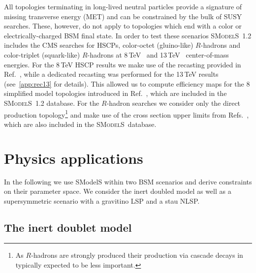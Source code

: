 \documentclass[preprint,number,sort&compress,twocolumn,3p]{elsstyarticle}
\newcommand{\smo}{\textsc{SModelS}}
\begin{document}
All topologies terminating in long-lived neutral particles provide a signature of missing transverse energy (MET) and can be constrained by  the bulk of SUSY searches. These, however, do not apply
to topologies which end with a color or electrically-charged BSM final state. In order to test these scenarios \smo~1.2 includes the CMS searches for HSCPs, color-octet (gluino-like) $R$-hadrons
and color-triplet (squark-like)  $R$-hadrons  at 8\,TeV~\cite{Chatrchyan:2013oca} and 13\,TeV~\cite{CMS-PAS-EXO-16-036} center-of-mass energies. For the 8\,TeV  HSCP results we make use of the recasting provided in Ref.~\cite{Khachatryan:2015lla}, while a dedicated recasting was performed for the 13\,TeV results (see~\ref{app:rec13} for details). This allowed us to compute efficiency maps for the 8 simplified model topologies introduced in Ref.~\cite{Heisig:2015yla}, which are included in the \smo~1.2 database.
For the $R$-hadron searches we consider only the direct production topology\footnote{As $R$-hadrons are strongly produced their production via cascade decays in typically expected to be less important.} and make use of the cross section upper limits from Refs.~\cite{Chatrchyan:2013oca,CMS-PAS-EXO-16-036}, which are also included in the \smo\ database.

%
%
%
%




\section{Physics applications}\label{sec:physapp}

In the following we use SModelS within two BSM scenarios and derive constraints 
on their parameter space. We consider the inert doubled model as well as a supersymmetric scenario with a gravitino LSP
and a stau NLSP\@.






\subsection{The inert doublet model}\label{sec:IDM}
\end{document}
